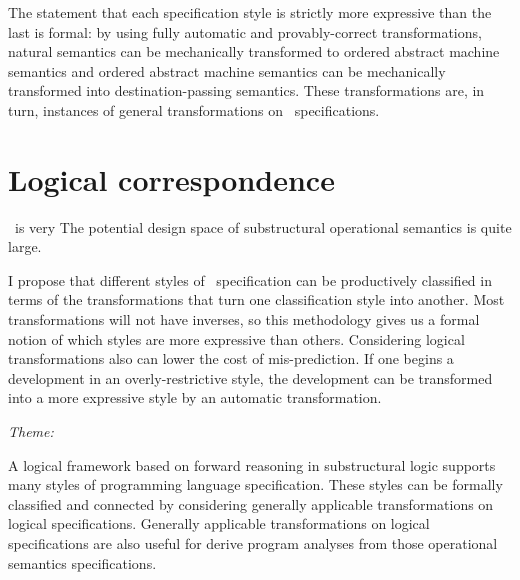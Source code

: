 \noindent
The statement that each specification style is strictly more
expressive than the last is formal: by using fully automatic and
provably-correct transformations, natural semantics can be
mechanically transformed to ordered abstract machine semantics and
ordered abstract machine semantics can be mechanically transformed
into destination-passing semantics. These transformations are, in
turn, instances of general transformations on \sls~specifications.

\section{Logical correspondence}

\sls~is very
The potential design space of substructural operational semantics is
quite large. 

I propose that different styles of
\sls~specification can be productively classified in terms of the
transformations that turn one classification style into another. Most
transformations will not have inverses, so this methodology gives us a
formal notion of which styles are more expressive than others.
Considering logical transformations also can lower the cost of
mis-prediction. If one begins a development in an overly-restrictive
style, the development can be transformed into a more expressive style
by an automatic transformation.


\begin{center}
{\it Theme:}

\medskip

A logical framework based on forward reasoning in substructural logic
supports many styles of programming language specification. These
styles can be formally classified and connected by considering
generally applicable transformations on logical
specifications. Generally applicable transformations on logical
specifications are also useful for derive program analyses from those
operational semantics specifications.
\end{center}


